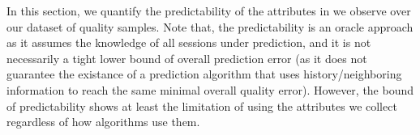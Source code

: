 \begin{figure}[t!]
\centering
{}
\label{fig:predictability}
\end{figure}



In this section, we quantify the predictability of the attributes in we observe over our dataset of quality samples. Note that, the predictability is an oracle approach as it assumes the knowledge of all sessions under prediction, and it is not necessarily a tight lower bound of overall prediction error (as it does not guarantee the existance of a prediction algorithm that uses history/neighboring information to reach the same minimal overall quality error). However, the bound of predictability shows at least the limitation of using the attributes we collect regardless of how algorithms use them.

